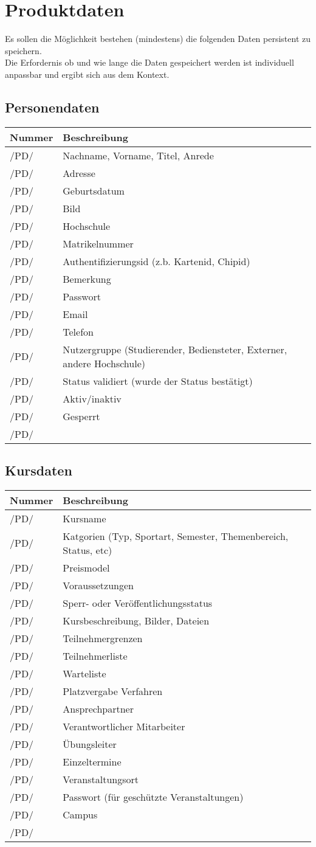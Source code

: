 \documentclass[a4paper,12pt]{article}
\newcommand\addrow[2]{#1 &#2\\ }
\newcommand\addheading[2]{#1 &#2\\ \hline}
\newcommand\tabularhead{\begin{tabular}{lp{13cm}}
\hline
}
\newenvironment{usecase}{\tabularhead}
{\hline\end{tabular}}
\begin{document}
\section{Produktdaten}
Es sollen die Möglichkeit bestehen (mindestens) die folgenden Daten persistent zu speichern.\\ Die Erfordernis ob und wie lange die Daten gespeichert werden ist individuell anpassbar und ergibt sich aus dem Kontext.\\
\subsection{Personendaten}
\begin{usecase}
  \addheading{Nummer}{Beschreibung} 
  \addrow{/PD/}{Nachname, Vorname, Titel, Anrede}
  \addrow{/PD/}{Adresse}
  \addrow{/PD/}{Geburtsdatum}
  \addrow{/PD/}{Bild}
  \addrow{/PD/}{Hochschule}
  \addrow{/PD/}{Matrikelnummer}
  \addrow{/PD/}{Authentifizierungsid (z.b. Kartenid, Chipid)}
  \addrow{/PD/}{Bemerkung}
  \addrow{/PD/}{Passwort}
  \addrow{/PD/}{Email}
  \addrow{/PD/}{Telefon}
  \addrow{/PD/}{Nutzergruppe (Studierender, Bediensteter, Externer, andere Hochschule)}
  \addrow{/PD/}{Status validiert (wurde der Status bestätigt)}
  \addrow{/PD/}{Aktiv/inaktiv}
  \addrow{/PD/}{Gesperrt}
  \addrow{/PD/}{}
\end{usecase}

\subsection{Kursdaten}
\begin{usecase}
  \addheading{Nummer}{Beschreibung} 
  \addrow{/PD/}{Kursname}
  \addrow{/PD/}{Katgorien (Typ, Sportart, Semester, Themenbereich, Status, etc)}
  \addrow{/PD/}{Preismodel}
  \addrow{/PD/}{Voraussetzungen}
  \addrow{/PD/}{Sperr- oder Veröffentlichungsstatus}
  \addrow{/PD/}{Kursbeschreibung, Bilder, Dateien}
  \addrow{/PD/}{Teilnehmergrenzen}
  \addrow{/PD/}{Teilnehmerliste}
  \addrow{/PD/}{Warteliste}
  \addrow{/PD/}{Platzvergabe Verfahren}
  \addrow{/PD/}{Ansprechpartner}
  \addrow{/PD/}{Verantwortlicher Mitarbeiter}
  \addrow{/PD/}{Übungsleiter}
  \addrow{/PD/}{Einzeltermine}
  \addrow{/PD/}{Veranstaltungsort}
  \addrow{/PD/}{Passwort (für geschützte Veranstaltungen)}
  \addrow{/PD/}{Campus}
  \addrow{/PD/}{}
\end{usecase}
\end{document}
